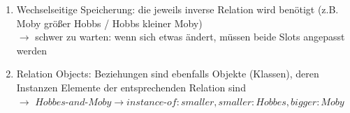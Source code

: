 \documentclass[runningheads,deutsch]{llncs}
\begin{document}
\begin{enumerate}
    \item Wechselseitige Speicherung: die jeweils inverse Relation wird benötigt (z.B. Moby größer Hobbs / Hobbs kleiner Moby) \\
          $\rightarrow$ schwer zu warten: wenn sich etwas ändert, müssen beide Slots angepasst werden
    \item Relation Objects: Beziehungen sind ebenfalls Objekte (Klassen), deren Instanzen Elemente der entsprechenden Relation sind \\
          $\rightarrow$ $\textit{Hobbes-and-Moby} \rightarrow \textit{instance-of}: \textit{smaller}, \textit{smaller}: Hobbes, \textit{bigger}: Moby$
\end{enumerate}

\pagebreak
\end{document}
